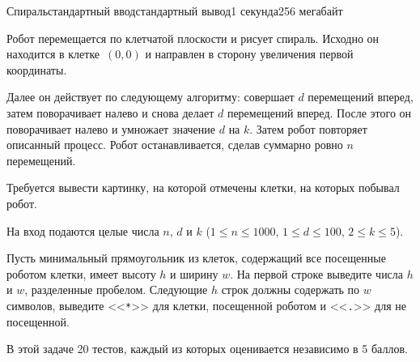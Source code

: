 \begin{problem}{Спираль}{стандартный ввод}{стандартный вывод}{1 секунда}{256 мегабайт}

Робот перемещается по клетчатой плоскости и рисует спираль. Исходно он находится в клетке~$(0, 0)$ и направлен в сторону увеличения первой координаты. 

Далее он действует по следующему алгоритму: совершает $d$ перемещений вперед, затем поворачивает налево и снова делает $d$ перемещений вперед. После этого он поворачивает налево и умножает значение $d$ на $k$. Затем робот повторяет описанный процесс. Робот останавливается, сделав суммарно ровно $n$ перемещений.

Требуется вывести картинку, на которой отмечены клетки, на которых побывал робот.

\InputFile
На вход подаются целые числа $n$, $d$ и $k$ ($1 \le n \le 1000$, $1 \le d \le 100$, $2 \le k \le 5$).

\OutputFile
Пусть минимальный прямоугольник из клеток, содержащий все посещенные роботом клетки, имеет высоту $h$ и ширину $w$. На первой строке выведите числа $h$ и $w$, разделенные пробелом. Следующие $h$ строк должны содержать по $w$ символов, выведите <<\texttt{*}>> для клетки, посещенной роботом и <<\texttt{.}>> для не посещенной.

\Scoring
В этой задаче 20 тестов, каждый из которых оценивается независимо в 5 баллов.

\Example

\begin{example}
%
\end{example}

\end{problem}

